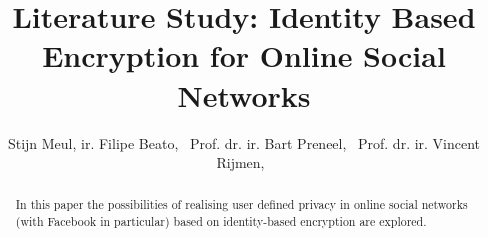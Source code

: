 \documentclass[journal]{IEEEtran}
\begin{document}
%
\title{Literature Study: Identity Based Encryption for Online Social Networks}
%
%
%

\author{Stijn Meul,
        ir. Filipe Beato,~
        Prof. dr. ir. Bart Preneel,~
        Prof. dr. ir. Vincent Rijmen,~%
        }

\markboth{}%
{}
% 

\maketitle

\begin{abstract}
In this paper the possibilities of realising user defined privacy in online
social networks (with Facebook in particular) based on identity-based
encryption are explored.
\end{abstract}







%
\IEEEpeerreviewmaketitle
\end{document}
